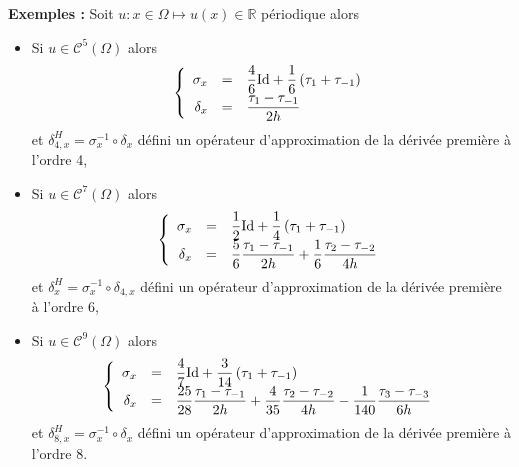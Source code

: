 \textbf{Exemples : }
Soit $u : x \in \Omega \mapsto u(x) \in \mathbb{R}$ périodique alors 
\begin{itemize}
\item Si $u \in \mathcal{C}^{5}(\Omega)$ alors 
\begin{equation}
\left\lbrace
\begin{array}{rcl}
\sigma_{x} &=& \dfrac{4}{6} \text{Id} + \dfrac{1}{6} \left( \tau_1 + \tau_{-1} \right)\\
\delta_{x} &=& \dfrac{\tau_1 - \tau_{-1}}{2h} \\ 
\end{array}
\right.
\label{eq:comp4}
\end{equation}
et $\delta^H_{4,x} = \sigma_x^{-1} \circ \delta_{x}$ défini un opérateur d'approximation de la dérivée première à l'ordre 4,

\item Si $u \in \mathcal{C}^{7}(\Omega)$ alors 
\begin{equation}
\left\lbrace
\begin{array}{rcl}
\sigma_{x} &=& \dfrac{1}{2} \text{Id} + \dfrac{1}{4}\left( \tau_1 + \tau_{-1} \right) \\
\delta_{x} &=& \dfrac{5}{6} \dfrac{\tau_1 - \tau_{-1}}{2h} + \dfrac{1}{6} \dfrac{\tau_2 - \tau_{-2}}{4h}\\ 
\end{array}
\right.
\label{eq:comp6}
\end{equation}
et $\delta^H_{x} = \sigma_{x}^{-1} \circ \delta_{4,x}$ défini un opérateur d'approximation de la dérivée première à l'ordre 6,


\item Si $u \in \mathcal{C}^{9}(\Omega)$ alors 
\begin{equation}
\left\lbrace
\begin{array}{rcl}
\sigma_{x} &=& \dfrac{4}{7} \text{Id} + \dfrac{3}{14}\left( \tau_1 + \tau_{-1} \right) \\
\delta_{x} &=& \dfrac{25}{28} \dfrac{\tau_1 - \tau_{-1}}{2h} + \dfrac{4}{35} \dfrac{\tau_2 - \tau_{-2}}{4h} - \dfrac{1}{140} \dfrac{\tau_3 - \tau_{-3}}{6h} \\ 
\end{array}
\right.
\label{eq:comp8}
\end{equation}
et $\delta^H_{8,x} = \sigma_{x}^{-1} \circ \delta_{x}$ défini un opérateur d'approximation de la dérivée première à l'ordre 8.
\end{itemize}


